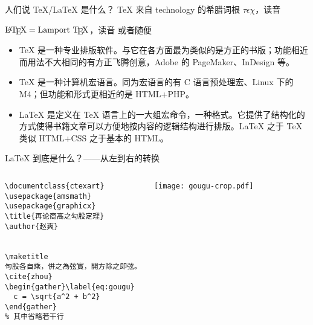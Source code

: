 \begin{frame}{人们说 \TeX/\LaTeX{} 是什么？}
\TeX{} 来自 technology 的希腊词根 $\tau\epsilon\chi$，读音 \textipa{[tEx]}

$\text{\LaTeX} = \text{Lamport \TeX}$，读音  或者随便
\pause
\begin{itemize}
\item
\TeX{} 是一种专业排版软件。与它在各方面最为类似的是方正的书版；功能相近而用法不大相同的有方正飞腾创意，Adobe 的 PageMaker、InDesign 等。
\item
\TeX{} 是一种计算机宏语言。同为宏语言的有 C 语言预处理宏、Linux 下的 M4；但功能和形式更相近的是 HTML+PHP。
\item
\LaTeX{} 是定义在 \TeX{} 语言上的一大组宏命令，一种格式。它提供了结构化的方式使得书籍文章可以方便地按内容的逻辑结构进行排版。\LaTeX{} 之于 \TeX{} 类似 HTML+CSS 之于基本的 HTML。
\end{itemize}
\pause
{}
\end{frame}


\begin{frame}[fragile]{\LaTeX{} 到底是什么？——从左到右的转换}
\begin{columns}
\begin{Verbatim}[fontsize=\footnotesize,frame=single]
\documentclass{ctexart}
\usepackage{amsmath}
\usepackage{graphicx}
\title{再论商高之勾股定理}
\author{赵爽}


\maketitle
句股各自乘，併之為弦實，開方除之即弦。
\cite{zhou}
\begin{gather}\label{eq:gougu}
  c = \sqrt{a^2 + b^2}
\end{gather}
% 其中省略若干行



\end{Verbatim}
\rule{0pt}{2cm}
\pause
{}
\texttt{[image: gougu-crop.pdf]}
\end{columns}
\pause
{}
\end{frame}

